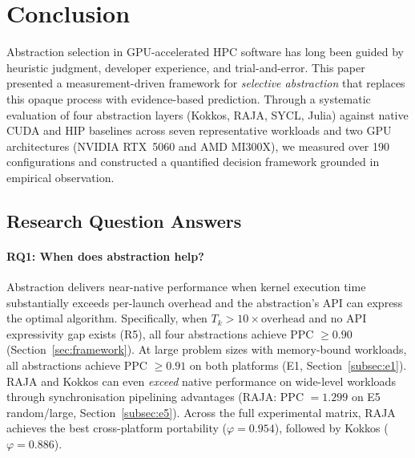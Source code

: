 
\section{Conclusion}
\label{sec:conclusion}

Abstraction selection in GPU-accelerated HPC software has long been guided
by heuristic judgment, developer experience, and trial-and-error. This paper
presented a measurement-driven framework for \emph{selective abstraction}
that replaces this opaque process with evidence-based prediction. Through
a systematic evaluation of four abstraction layers (Kokkos, RAJA, SYCL,
Julia) against native CUDA and HIP baselines across seven representative
workloads and two GPU architectures (NVIDIA RTX~5060 and AMD MI300X), we
measured over 190 configurations and constructed a quantified decision
framework grounded in empirical observation.

\subsection*{Research Question Answers}

\paragraph{RQ1: When does abstraction help?}
Abstraction delivers near-native performance when kernel execution time
substantially exceeds per-launch overhead and the abstraction's API can
express the optimal algorithm. Specifically, when $T_k > 10 \times
\text{overhead}$ and no API expressivity gap exists (R5), all four
abstractions achieve PPC $\geq 0.90$ (Section~\ref{sec:framework}). At
large problem sizes with memory-bound workloads, all abstractions achieve
PPC $\geq 0.91$ on both platforms (E1, Section~\ref{subsec:e1}). RAJA and
Kokkos can even \emph{exceed} native performance on wide-level workloads
through synchronisation pipelining advantages (RAJA: PPC $= 1.299$ on E5
random/large, Section~\ref{subsec:e5}). Across the full experimental
matrix, RAJA achieves the best cross-platform portability
($\varphi = 0.954$), followed by Kokkos ($\varphi = 0.886$).

